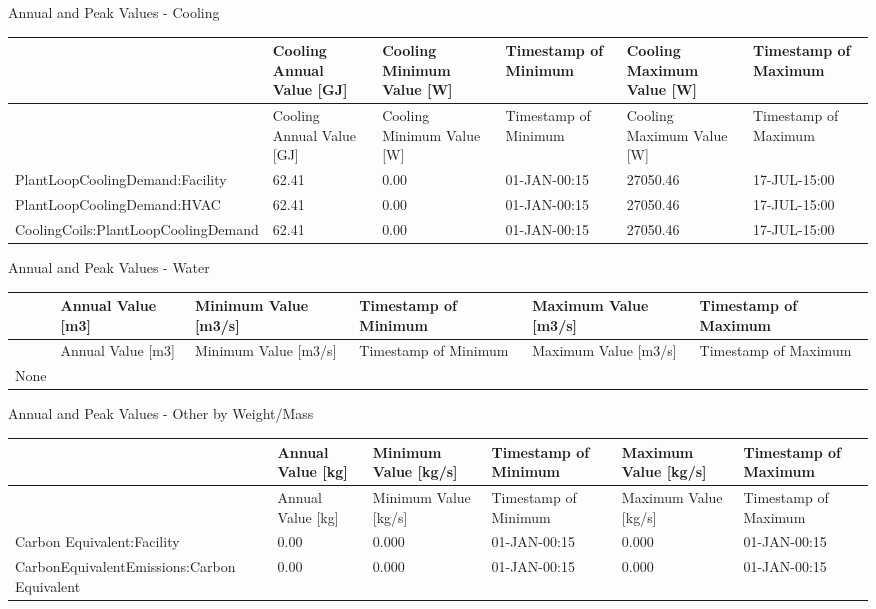 Annual and Peak Values - Cooling

{\scriptsize
\begin{longtable}[c]{>{\raggedright}p{1.0in}>{\raggedright}p{1.0in}>{\raggedright}p{1.0in}>{\raggedright}p{1.0in}>{\raggedright}p{1.0in}>{\raggedright}p{1.0in}}
\toprule
 & Cooling Annual Value [GJ] & Cooling Minimum Value [W] & Timestamp of Minimum & Cooling Maximum Value [W] & Timestamp of Maximum \tabularnewline
\midrule
\endfirsthead

\toprule
 & Cooling Annual Value [GJ] & Cooling Minimum Value [W] & Timestamp of Minimum & Cooling Maximum Value [W] & Timestamp of Maximum \tabularnewline
\midrule
\endhead

PlantLoopCoolingDemand\-:Facility & 62.41 & 0.00 & 01-JAN-00\-:15 & 27050.46 & 17-JUL-15\-:00 \tabularnewline
PlantLoopCoolingDemand\-:HVAC & 62.41 & 0.00 & 01-JAN-00\-:15 & 27050.46 & 17-JUL-15\-:00 \tabularnewline
CoolingCoils\-:PlantLoopCoolingDemand & 62.41 & 0.00 & 01-JAN-00\-:15 & 27050.46 & 17-JUL-15\-:00 \tabularnewline
\bottomrule
\end{longtable}}

Annual and Peak Values - Water

\begin{longtable}[c]{>{\raggedright}p{1.0in}>{\raggedright}p{1.0in}>{\raggedright}p{1.0in}>{\raggedright}p{1.0in}>{\raggedright}p{1.0in}>{\raggedright}p{1.0in}}
\toprule
 & Annual Value [m3] & Minimum Value [m3/s] & Timestamp of Minimum & Maximum Value [m3/s] & Timestamp of Maximum \tabularnewline
\midrule
\endfirsthead

\toprule
 & Annual Value [m3] & Minimum Value [m3/s] & Timestamp of Minimum & Maximum Value [m3/s] & Timestamp of Maximum \tabularnewline
\midrule
\endhead

None & ~ & ~ & ~ & ~ & ~ \tabularnewline
\bottomrule
\end{longtable}

Annual and Peak Values - Other by Weight/Mass

{\scriptsize
\begin{longtable}[c]{>{\raggedright}p{1.0in}>{\raggedright}p{1.0in}>{\raggedright}p{1.0in}>{\raggedright}p{1.0in}>{\raggedright}p{1.0in}>{\raggedright}p{1.0in}}
  \toprule
  & Annual Value [kg] & Minimum Value [kg/s] & Timestamp of Minimum & Maximum Value [kg/s] & Timestamp of Maximum \tabularnewline
  \midrule
  \endfirsthead

  \toprule
  & Annual Value [kg] & Minimum Value [kg/s] & Timestamp of Minimum & Maximum Value [kg/s] & Timestamp of Maximum \tabularnewline
  \midrule
  \endhead

  Carbon Equivalent\-:Facility & 0.00 & 0.000 & 01-JAN-00\-:15 & 0.000 & 01-JAN-00\-:15 \tabularnewline
  Carbon\-Equivalent\-Emissions\-:Carbon Equivalent & 0.00 & 0.000 & 01-JAN-00\-:15 & 0.000 & 01-JAN-00\-:15 \tabularnewline
  \bottomrule
\end{longtable}}

